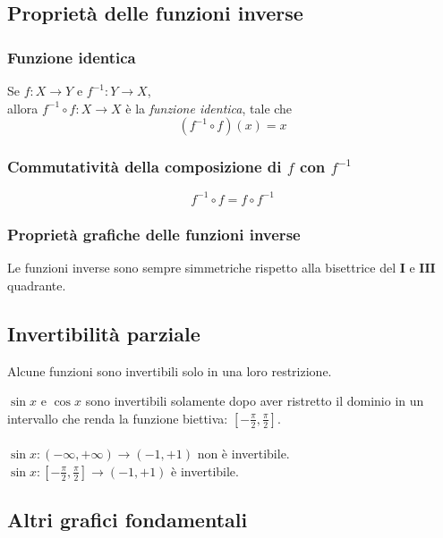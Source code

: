 \documentclass[a4paper,12pt, oneside]{book}
\begin{document}
\subsection{Proprietà delle funzioni inverse}
\subsubsection{Funzione identica}
\begin{definizione} Se $f:X\rightarrow Y$ e $f^{-1}:Y\rightarrow X$,\\ allora
  $f^{-1}\circ f: X \rightarrow X$ è la \emph{funzione identica}, tale che
  \begin{equation} (f^{-1}\circ f)(x)=x
  \end{equation}
\end{definizione}
\subsubsection{Commutatività della composizione di $f$ con $f^{-1}$}
\begin{equation} f^{-1}\circ f= f\circ f^{-1}
\end{equation}
\subsubsection{Proprietà grafiche delle funzioni inverse} Le funzioni inverse
sono sempre simmetriche rispetto alla bisettrice del $\mathbf{I}$ e
$\mathbf{III}$ quadrante.
\subsection{Invertibilità parziale} Alcune funzioni sono invertibili solo in una
loro restrizione.
\begin{esempio} $\sin{x}$ e $\cos{x}$ sono invertibili solamente dopo aver
  ristretto il dominio in un intervallo che renda la funzione biettiva:
  $[-\frac{\pi}{2}, \frac{\pi}{2}]$.\\\\ $\sin{x}: (-\infty, +\infty) \rightarrow
  (-1, +1)$ non è invertibile.\\ $\sin{x}: [-\frac{\pi}{2}, \frac{\pi}{2}]
  \rightarrow (-1, +1)$ è invertibile.
\end{esempio}
\subsection{Altri grafici fondamentali}

 ~
\end{document}
